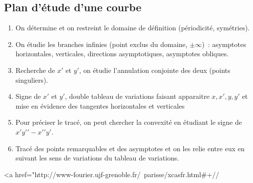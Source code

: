 \documentclass[a4paper,11pt]{article}
\begin{document}
\begin{giacjshere}
\subsection{Plan d'\'etude d'une courbe}
\begin{enumerate}
\item On d\'etermine et on restreint le domaine de d\'efinition
(p\'eriodicit\'e, sym\'etries). 
\item On \'etudie les branches infinies (point exclus du domaine,
$\pm \infty$)~: asymptotes horizontales, verticales, directions
asymptotiques, asymptotes obliques.
\item Recherche de $x'$ et $y'$, on \'etudie l'annulation conjointe
  des deux (points singuliers).
\item Signe de $x'$ et $y'$, double tableau de variations faisant
apparaitre $x,x',y,y'$ et mise
en \'evidence des tangentes horizontales et verticales
\item Pour pr\'eciser le trac\'e, on peut chercher la convexit\'e
en \'etudiant le signe de $x'y'{'}-x'{'}y'$.
\item Trac\'e des points remarquables et des asymptotes et
on les relie entre eux en suivant les sens de variations
du tableau de variations.
\end{enumerate}
\ifhevea
\begin{rawhtml}
<a href="http://www-fourier.ujf-grenoble.fr/~parisse/xcasfr.html#+//%
\end{rawhtml}
\fi


\end{giacjshere}
\end{document}

